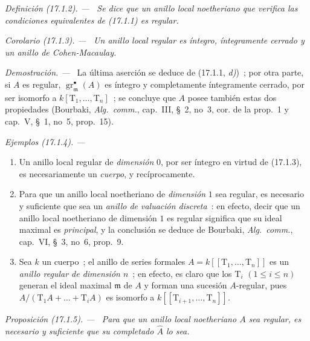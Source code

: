 \documentclass[10pt,oneside]{book}
\makeatletter
\newcommand{\setmanualcurrentlabel}[1]{\def\@currentlabel{#1}}
\newenvironment{definition}[1][]{%
  \setmanualcurrentlabel{#1}\par\medskip\noindent\itshape Definición (#1). ---\ }{\par}
\newenvironment{proposition}[1][]{%
  \setmanualcurrentlabel{#1}\par\medskip\noindent\itshape Proposición (#1). ---\ }{\par}
\newenvironment{corollary}[1][]{%
  \setmanualcurrentlabel{#1}\par\medskip\noindent\itshape Corolario (#1). ---\ }{\par}
\newenvironment{examples}[1][]{%
  \setmanualcurrentlabel{#1}\par\medskip\noindent\textit{Ejemplos (#1). ---}\ }{\par}
\newenvironment{proof}{%
  \par\medskip\noindent\textit{Demostración. ---\ }}{\par}
\makeatother
\begin{document}
\begin{definition}[17.1.2]
\label{0.17.1.2-es}
Se dice que un anillo local noetheriano que verifica las condiciones equivalentes de
\textup{(17.1.1)} es regular.
\end{definition}

\begin{corollary}[17.1.3]
\label{0.17.1.3-es}
Un anillo local regular es íntegro, íntegramente cerrado y un anillo de
Cohen-Macaulay.
\end{corollary}

\begin{proof}
La última aserción se deduce de (17.1.1, \emph{d)})~; por otra parte, si $A$ es
regular, $\operatorname{gr}^\bullet_{\mathfrak{m}}(A)$ es íntegro y completamente
íntegramente cerrado, por ser isomorfo a $k[\mathrm{T}_1,\ldots,\mathrm{T}_n]$~;
se concluye que $A$ posee también estas dos propiedades (Bourbaki,
\emph{Alg.~comm.}, cap.~III, \S~2, no~3, cor. de la prop.~1 y cap.~V,
\S~1, no~5, prop.~15).
\end{proof}

\begin{examples}[17.1.4]
\label{0.17.1.4-es}
\begin{enumerate}
  \item[\rm (i)] Un anillo local regular de \emph{dimensión} $0$, por ser
  íntegro en virtud de (17.1.3), es necesariamente un \emph{cuerpo}, y recíprocamente.
  \item[\rm (ii)] Para que un anillo local noetheriano de \emph{dimensión} $1$
  sea regular, es necesario y suficiente que sea un \emph{anillo de valuación
  discreta}~: en efecto, decir que un anillo local noetheriano de dimensión $1$ es
  regular significa que su ideal maximal es \emph{principal}, y la conclusión
  se deduce de Bourbaki, \emph{Alg.~comm.}, cap.~VI, \S~3, no~6, prop.~9.
  \item[\rm (iii)] Sea $k$ un cuerpo~; el anillo de series formales
  $A=k[[\mathrm{T}_1,\ldots,\mathrm{T}_n]]$ es un \emph{anillo regular de
  dimensión $n$}~; en efecto, es claro que los $\mathrm{T}_i$
  $(1\leq i\leq n)$ generan el ideal maximal $\mathfrak{m}$ de $A$ y
  forman una sucesión $A$-regular, pues
  $A/(\mathrm{T}_1A+\ldots+\mathrm{T}_iA)$ es isomorfo a
  $k[[\mathrm{T}_{i+1},\ldots,\mathrm{T}_n]]$.
\end{enumerate}
\end{examples}

\begin{proposition}[17.1.5]
\label{0.17.1.5-es}
Para que un anillo local noetheriano $A$ sea regular, es necesario y suficiente que
su completado $\widehat{A}$ lo sea.
\end{proposition}
\end{document}
